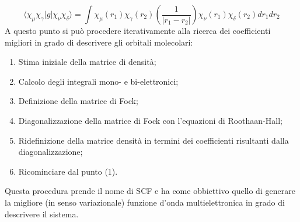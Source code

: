 \documentclass[oneside]{amsbook}
\numberwithin{section}{chapter}
\numberwithin{equation}{section}
\numberwithin{figure}{section}
\begin{document}
\begin{equation}
\langle\chi_{\mu}\chi_{\gamma}\vert g \vert\chi_{\nu}\chi_{\delta}\rangle= \int \chi_\mu (r_1) \chi_\gamma(r_2)\left(\frac{1}{\vert r_1-r_2\vert}\right)\chi_{\nu}(r_1)\chi_{\delta}(r_2) dr_1 dr_2 
\end{equation}
A questo punto si può procedere iterativamente alla ricerca dei coefficienti migliori in grado di descrivere gli orbitali molecolari:
\begin{enumerate}
\item Stima iniziale della matrice di densità;
\item Calcolo degli integrali mono- e bi-elettronici;
\item Definizione della matrice di Fock;
\item Diagonalizzazione della matrice di Fock con l'equazioni di Roothaan-Hall;
\item Ridefinizione della matrice densità in termini dei coefficienti risultanti dalla diagonalizzazione;
\item Ricominciare dal punto (1).
\end{enumerate}
Questa procedura prende il nome di SCF e ha come obbiettivo quello di generare la migliore (in senso variazionale) funzione d'onda multielettronica in grado di descrivere il sistema.
\end{document}
